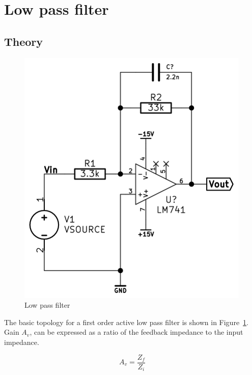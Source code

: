 \documentclass[11pt,a4paper]{article}
\begin{document}
\section{Low pass filter}\label{lowpass-filter}

\subsection{Theory}\label{lpf-theory}
\begin{figure}[htbp]
    \centering
        \includegraphics[scale=0.5]{img/lowpassfilter.png}
    \caption{Low pass filter}
    \label{fig:lpf-schem}
\end{figure}

The basic topology for a first order active low pass filter is shown in Figure~\ref{fig:lpf-schem}.
Gain $A_v$, can be expressed as a ratio of the
feedback impedance to the input impedance. 

\begin{equation}
    A_v = \frac{Z_f}{Z_i}
\end{equation}
\end{document}
